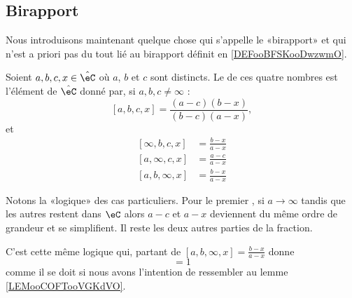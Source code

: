 \subsection{Birapport}

Nous introduisons maintenant quelque chose qui s'appelle le «birapport» et qui n'est a priori pas du tout lié au birapport définit en \ref{DEFooBFSKooDwzwmO}.

\begin{definition}        \label{DEFooQYHVooMZwQMB}
    Soient \( a,b,c,x\in \hat\eC\) où \( a\), \( b\) et \( c\) sont distincts. Le  de ces quatre nombres est l'élément de \( \hat\eC\) donné par, si \( a,b,c\neq \infty\) :
    \begin{equation}        \label{EQooQJWZooOXKslh}
        [a,b,c,x]=\frac{ (a-c)(b-x) }{ (b-c)(a-x) },
    \end{equation}
    et
    \begin{subequations}
        \begin{align}
            [\infty,b,c,x]&=\frac{ b-x }{ a-x }\\
            [a,\infty,c,x]&=\frac{a-c}{a-x}\\
            [a,b,\infty,x]&=\frac{ b-x }{ a-x }
        \end{align}
    \end{subequations}
\end{definition}

\begin{normaltext}
    Notons la «logique» des cas particuliers. Pour le premier%
    , si \( a\to\infty\) tandis que les autres restent dans \( \eC\) alors \( a-c\) et \( a-x\) deviennent du même ordre de grandeur et se simplifient. Il reste les deux autres parties de la fraction.

    C'est cette même logique qui, partant de \( [a,b,\infty,x]=\frac{ b-x }{ a-x }\) donne
    \begin{equation}
        [a,b,\infty,\infty]=1
    \end{equation}
    comme il se doit si nous avons l'intention de ressembler au lemme \ref{LEMooCOFTooVGKdVO}.
\end{normaltext}

